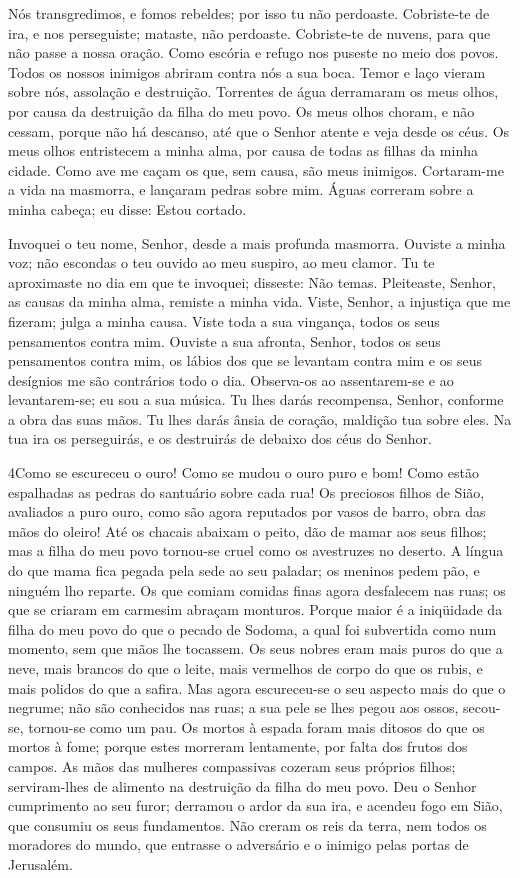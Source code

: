 Nós transgredimos, e fomos rebeldes; por isso tu não perdoaste.
Cobriste-te de ira, e nos perseguiste; mataste, não
perdoaste. Cobriste-te de nuvens, para que não passe a nossa
oração. Como escória e refugo nos puseste no meio dos povos.
Todos os nossos inimigos abriram contra nós a sua boca.
Temor e laço vieram sobre nós, assolação e destruição.
Torrentes de água derramaram os meus olhos, por causa da
destruição da filha do meu povo. Os meus olhos choram, e não
cessam, porque não há descanso, até que o Senhor  atente e
veja desde os céus. Os meus olhos entristecem a minha alma,
por causa de todas as filhas da minha cidade. Como ave me
caçam os que, sem causa, são meus inimigos. Cortaram-me a
vida na masmorra, e lançaram pedras sobre mim. Águas correram
sobre a minha cabeça; eu disse: Estou cortado.

Invoquei o teu nome, Senhor, desde a mais profunda masmorra.
Ouviste a minha voz; não escondas o teu ouvido ao meu
suspiro, ao meu clamor. Tu te aproximaste no dia em que te
invoquei; disseste: Não temas. Pleiteaste, Senhor, as causas
da minha alma, remiste a minha vida. Viste, Senhor, a
injustiça que me fizeram; julga a minha causa. Viste toda a
sua vingança, todos os seus pensamentos contra mim. Ouviste a
sua afronta, Senhor, todos os seus pensamentos contra mim, os
lábios dos que se levantam contra mim e os seus desígnios me são
contrários todo o dia. Observa-os ao assentarem-se e ao
levantarem-se; eu sou a sua música. Tu lhes darás recompensa,
Senhor, conforme a obra das suas mãos. Tu lhes darás ânsia de
coração, maldição tua sobre eles. Na tua ira os perseguirás,
e os destruirás de debaixo dos céus do Senhor.

\medskip

\lettrine{4} Como se escureceu o ouro! Como se mudou o ouro
puro e bom! Como estão espalhadas as pedras do santuário sobre cada
rua! Os preciosos filhos de Sião, avaliados a puro ouro, como
são agora reputados por vasos de barro, obra das mãos do oleiro!
Até os chacais abaixam o peito, dão de mamar aos seus filhos;
mas a filha do meu povo tornou-se cruel como os avestruzes no
deserto. A língua do que mama fica pegada pela sede ao seu
paladar; os meninos pedem pão, e ninguém lho reparte. Os que
comiam comidas finas agora desfalecem nas ruas; os que se criaram em
carmesim abraçam monturos. Porque maior é a iniqüidade da filha
do meu povo do que o pecado de Sodoma, a qual foi subvertida como
num momento, sem que mãos lhe tocassem. Os seus nobres eram mais
puros do que a neve, mais brancos do que o leite, mais vermelhos de
corpo do que os rubis, e mais polidos do que a safira. Mas agora
escureceu-se o seu aspecto mais do que o negrume; não são conhecidos
nas ruas; a sua pele se lhes pegou aos ossos, secou-se, tornou-se
como um pau. Os mortos à espada foram mais ditosos do que os
mortos à fome; porque estes morreram lentamente, por falta dos
frutos dos campos. As mãos das mulheres compassivas cozeram
seus próprios filhos; serviram-lhes de alimento na destruição da
filha do meu povo. Deu o Senhor  cumprimento ao seu furor;
derramou o ardor da sua ira, e acendeu fogo em Sião, que consumiu os
seus fundamentos. Não creram os reis da terra, nem todos os
moradores do mundo, que entrasse o adversário e o inimigo pelas
portas de Jerusalém.

